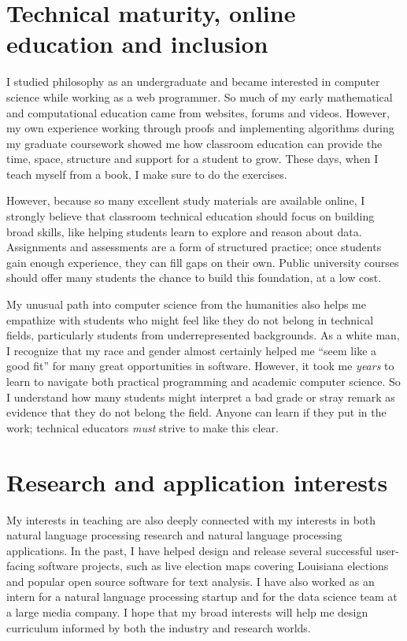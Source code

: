 \documentclass{article}
\begin{document}
\section*{\normalsize Technical maturity, online education and inclusion}

I studied philosophy as an undergraduate and became interested in computer science while working as a web programmer. So much of my early mathematical and computational education came from websites, forums and videos. However, my own experience working through proofs and implementing algorithms during my graduate coursework showed me how classroom education can provide the time, space, structure and support for a student to grow. These days, when I teach myself from a book, I make sure to do the exercises.

However, because so many excellent study materials are available online, I strongly believe that classroom technical education should focus on building broad skills, like helping students learn to explore and reason about data. Assignments and assessments are a form of structured practice; once students gain enough experience, they can fill gaps on their own. Public university courses should offer many students the chance to build this foundation, at a low cost.

My unusual path into computer science from the humanities also helps me empathize with students who might feel like they do not belong in technical fields, particularly students from underrepresented backgrounds. As a white man, I recognize that my race and gender almost certainly helped me ``seem like a good fit'' for many great opportunities in software. However, it took me \textit{years} to learn to navigate both practical programming and academic computer science. So I understand how many students might interpret a bad grade or stray remark as evidence that they do not belong the field. Anyone can learn if they put in the work; technical educators \textit{must} strive to make this clear.

\section*{\normalsize Research and application interests}

My interests in teaching are also deeply connected with my interests in both natural language processing research and natural language processing applications. In the past, I have helped design and release several successful user-facing software projects, such as live election maps covering Louisiana elections and popular open source software for text analysis. I have also worked as an intern for a natural language processing startup and for the data science team at a large media company. I hope that my broad interests will help me design curriculum informed by both the industry and research worlds.
\end{document}
